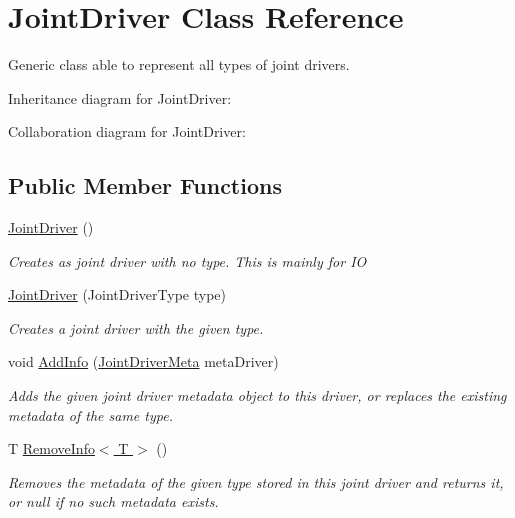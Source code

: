 \hypertarget{class_joint_driver}{}\section{Joint\+Driver Class Reference}
\label{class_joint_driver}


Generic class able to represent all types of joint drivers.  




Inheritance diagram for Joint\+Driver\+:


Collaboration diagram for Joint\+Driver\+:
\subsection*{Public Member Functions}
\begin{DoxyCompactItemize}
\item 
\hyperlink{class_joint_driver_aa9024a29db9bdac4465e244544521718}{Joint\+Driver} ()
\begin{DoxyCompactList}\small\item\em Creates as joint driver with no type. This is mainly for IO \end{DoxyCompactList}\item 
\hyperlink{class_joint_driver_a8fcc7584ca80fb8f69e855be6fbe488f}{Joint\+Driver} (Joint\+Driver\+Type type)
\begin{DoxyCompactList}\small\item\em Creates a joint driver with the given type. \end{DoxyCompactList}\item 
void \hyperlink{class_joint_driver_a7b35af4634caa4dbcbe3cd88ba365a68}{Add\+Info} (\hyperlink{class_joint_driver_meta}{Joint\+Driver\+Meta} meta\+Driver)
\begin{DoxyCompactList}\small\item\em Adds the given joint driver metadata object to this driver, or replaces the existing metadata of the same type. \end{DoxyCompactList}\item 
T \hyperlink{class_joint_driver_ac8981cc67c8ddc2c196717c31d109cc4}{Remove\+Info$<$ T $>$} ()
\begin{DoxyCompactList}\small\item\em Removes the metadata of the given type stored in this joint driver and returns it, or null if no such metadata exists. \end{DoxyCompactList}\item 

\end{DoxyCompactItemize}
